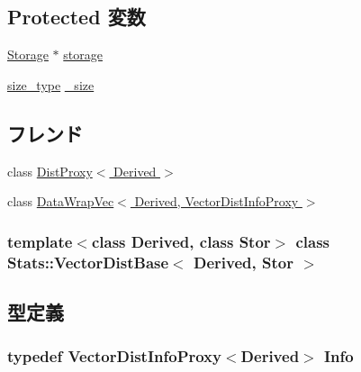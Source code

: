 \subsection*{Protected 変数}
\begin{DoxyCompactItemize}
\item 
\hyperlink{classStats_1_1VectorDistBase_a5d4a6db0e7c32292f54a08d05c671bd1}{Storage} $\ast$ \hyperlink{classStats_1_1VectorDistBase_a1b410f65a3077609e9b1902c52136304}{storage}
\item 
\hyperlink{namespaceStats_ada51e68d31936547d3729c82daf6b7c6}{size\_\-type} \hyperlink{classStats_1_1VectorDistBase_a9f1927ae81f20205d93e0b86915f27d7}{\_\-size}
\end{DoxyCompactItemize}
\subsection*{フレンド}
\begin{DoxyCompactItemize}
\item 
class \hyperlink{classStats_1_1VectorDistBase_ae4e3b17825b3cd119a56463a20e17192}{DistProxy$<$ Derived $>$}
\item 
class \hyperlink{classStats_1_1VectorDistBase_a7b8537e9160298dae198519c7f6aafa7}{DataWrapVec$<$ Derived, VectorDistInfoProxy $>$}
\end{DoxyCompactItemize}
\subsubsection*{template$<$class Derived, class Stor$>$ class Stats::VectorDistBase$<$ Derived, Stor $>$}



\subsection{型定義}
\hypertarget{classStats_1_1VectorDistBase_a15ec5f8f1a2c998c2496fad068947481}{
\subsubsection[{Info}]{\setlength{\rightskip}{0pt plus 5cm}typedef {\bf VectorDistInfoProxy}$<$Derived$>$ {\bf Info}}}
\label{classStats_1_1VectorDistBase_a15ec5f8f1a2c998c2496fad068947481}


